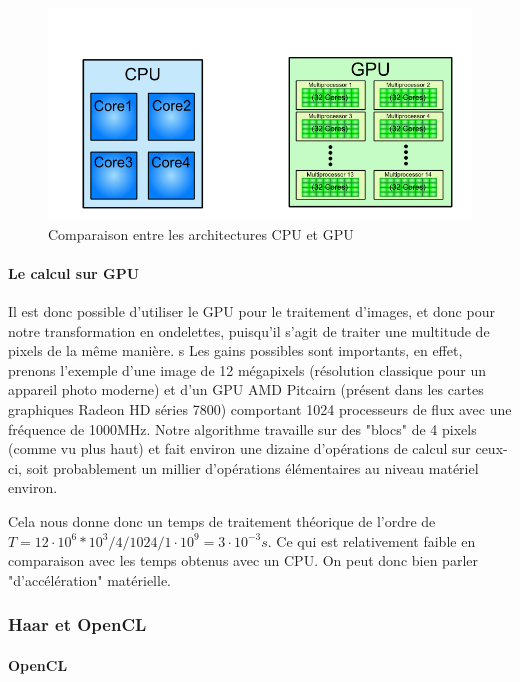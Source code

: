\begin{figure}[!h]
\centering
\includegraphics[scale=0.5]{images/cpugpu.png}
\caption{Comparaison entre les architectures CPU et GPU}
\label{cpugpu}
\end{figure}

\clearpage

\paragraph{Le calcul sur GPU}

Il est donc possible d'utiliser le GPU pour le traitement d'images, et donc pour notre transformation en ondelettes, puisqu'il s'agit de traiter une multitude de pixels de la même manière.
s
Les gains possibles sont importants, en effet, prenons l'exemple d'une image de 12 mégapixels (résolution classique pour un appareil photo moderne) et d'un GPU AMD Pitcairn (présent dans les cartes graphiques Radeon HD séries 7800) comportant 1024 processeurs de flux avec une fréquence de 1000MHz. Notre algorithme travaille sur des "blocs" de 4 pixels (comme vu plus haut) et fait environ une dizaine d'opérations de calcul sur ceux-ci, soit probablement un millier d'opérations élémentaires au niveau matériel environ.

Cela nous donne donc un temps de traitement théorique de l'ordre de $T = 12\cdot{}10^6 * 10^3 / 4 / 1024 / 1\cdot{}10^9 = 3\cdot{}10^{-3} s$. Ce qui est relativement faible en comparaison avec les temps obtenus avec un CPU. On peut donc bien parler "d'accélération" matérielle.

\subsubsection{Haar et OpenCL}

\paragraph{OpenCL}

